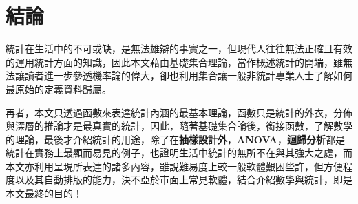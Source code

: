 		\section{結論 {}}
		統計在生活中的不可或缺，是無法雄辯的事實之一，但現代人往往無法正確且有效的運用統計方面的知識，因此本文藉由基礎集合理論，當作概述統計的開端，雖無法讓讀者進一步參透機率論的偉大，卻也利用集合讓一般非統計專業人士了解如何最原始的定義資料歸屬。
		
		再者，本文只透過函數來表達統計內涵的最基本理論，函數只是統計的外衣，分佈與深層的推論才是最真實的統計，因此，隨著基礎集合論後，銜接函數，了解數學的理論，最後才介紹統計的用途，除了在\textbf{抽樣設計外}，\textbf{ANOVA}，\textbf{迴歸分析}都是統計在實務上最顯而易見的例子，也證明生活中統計的無所不在與其強大之處，而本文亦利用\XeLaTeX 呈現所表達的諸多內容，雖說難易度上較一般軟體艱困些許，但方便程度以及其自動排版的能力，決不亞於市面上常見軟體，結合\XeLaTeX 介紹數學與統計，即是本文最終的目的！
		
	
%








